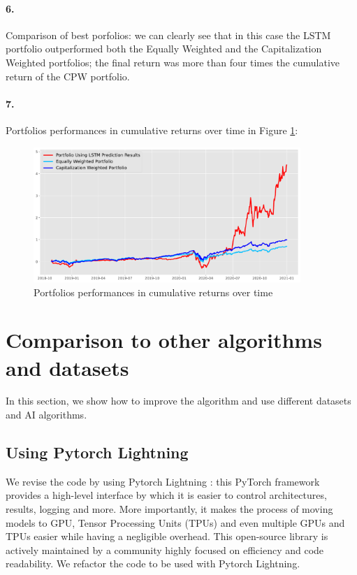 \documentclass[12pt]{article}
\begin{document}
\paragraph{6.} Comparison of best porfolios: we can clearly see that in this case the LSTM portfolio outperformed both the Equally Weighted and the Capitalization Weighted portfolios; the final return was more than four times the cumulative return of the CPW portfolio.

\paragraph{7. } Portfolios performances in cumulative returns over time in Figure \ref{fig:portfolio_fin}:

\begin{figure}[h!]
    \centering
    \includegraphics[width=0.9\textwidth]{images/portfolio_lstm.pdf}
    \caption{Portfolios performances in cumulative returns over time}
    \label{fig:portfolio_fin}
\end{figure}

\section{Comparison to other algorithms and datasets}
In this section, we show how to improve the algorithm and use different datasets and AI algorithms.

\subsection{Using Pytorch Lightning}
We revise the code by using Pytorch Lightning \cite{falcon2019pytorch}: this PyTorch framework provides a high-level interface by which it is easier to control architectures, results, logging and more. 
More importantly, it makes the process of moving models to GPU, Tensor Processing Units (TPUs) and even multiple GPUs and TPUs easier while having a negligible overhead. This open-source library is actively maintained by a community highly focused on efficiency and code readability. We refactor the code to be used with Pytorch Lightning.
\end{document}

